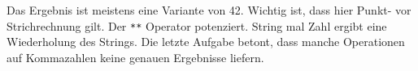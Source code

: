 Das Ergebnis ist meistens eine Variante von 42. Wichtig ist, dass hier
Punkt- vor Strichrechnung gilt. Der \texttt{**} Operator potenziert.
String mal Zahl ergibt eine Wiederholung des Strings. Die letzte Aufgabe
betont, dass manche Operationen auf Kommazahlen keine genauen Ergebnisse
liefern.
